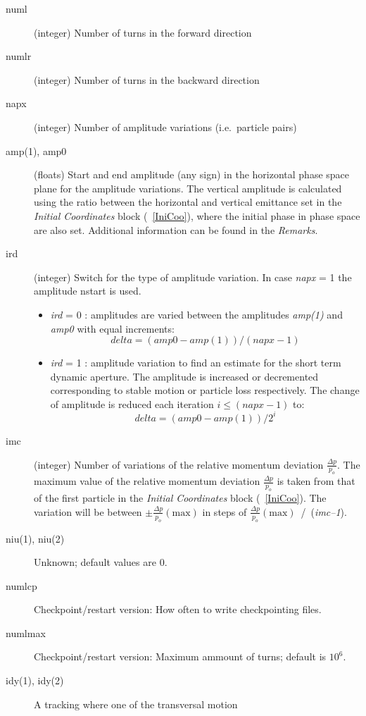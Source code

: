 \documentclass[a4paper,11pt]{report}
\begin{document}
\begin{description}
\item [numl] (integer) Number of turns in the forward direction
\item [numlr] (integer) Number of turns in the backward direction
\item [napx] (integer) Number of amplitude variations (i.e.\ particle pairs)
\item [amp(1), amp0] (floats) Start and end amplitude (any sign) in
  the horizontal phase space plane for the amplitude variations. The
  vertical amplitude is calculated using the ratio between the
  horizontal and vertical emittance set in the {\em Initial
    Coordinates} \/block (~\ref{IniCoo}), where the initial phase in
  phase space are also set. Additional information can be found in the
  {\em Remarks}\/.
\item [ird] (integer) Switch for the type of amplitude variation. In
  case {\em napx} \/= 1 the amplitude nstart is used.
 \begin{itemize}
 \item {\em ird} \/= 0 : amplitudes are varied between the amplitudes
   {\em amp(1)} \/and {\em amp0} \/with equal increments:
   $$
   delta = (amp0-amp(1)) / (napx-1)
   $$
 \item {\em ird} \/= 1 : amplitude variation to find an estimate for
   the short term dynamic aperture. The amplitude is increased or
   decremented corresponding to stable motion or particle loss
   respectively.  The change of amplitude is reduced each iteration
   \mbox{$i \le (napx-1) $} to:
   $$
   delta = (amp0-amp(1)) / 2^{i}
   $$
 \end{itemize}
\item [imc] (integer) Number of variations of the relative momentum
  deviation \mbox{$ \frac{\Delta p}{p_o} $}.  The maximum value of the
  relative momentum deviation \mbox{$ \frac{\Delta p}{p_o} $} is taken
  from that of the first particle in the {\em Initial Coordinates}
  \/block (~\ref{IniCoo}).  The variation will be between \mbox{$ \pm
    \frac{\Delta p}{p_o} (\mathrm{max}) $} in steps of \mbox{$
    \frac{\Delta p}{p_o} (\mathrm{max}) $ / ({\em imc--1}\/).}
\item[niu(1), niu(2)] Unknown; default values are 0.
\item[numlcp] Checkpoint/restart version: How often to write checkpointing files.
\item[numlmax] Checkpoint/restart version: Maximum ammount of turns; default is $10^6$.
\item [idy(1), idy(2)] A tracking where one of the transversal motion

\end{description}
\end{document}

